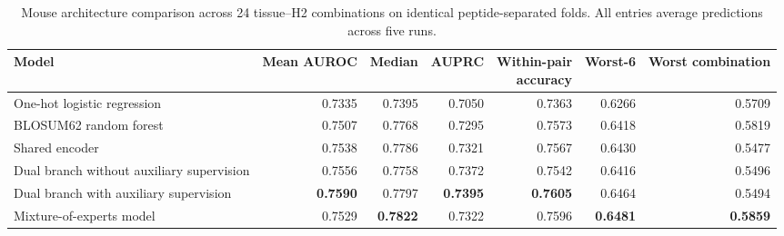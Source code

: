 \begin{table}[!b]
\centering
\caption{Mouse architecture comparison across 24 tissue--H2 combinations on identical peptide-separated folds. All entries average predictions across five runs.}
\label{tab:mouse-strict-architectures}
\fontsize{7.5}{8.5}\selectfont
\renewcommand{\arraystretch}{0.98}
\setlength{\tabcolsep}{1pt}
\begin{tabularx}{\textwidth}{>{\raggedright\arraybackslash}Xrrrrrr}
\toprule
Model & Mean AUROC & Median & AUPRC & \shortstack{Within-pair\\accuracy} & Worst-6 & Worst combination \\
\midrule
One-hot logistic regression & 0.7335 & 0.7395 & 0.7050 & 0.7363 & 0.6266 & 0.5709 \\
BLOSUM62 random forest & 0.7507 & 0.7768 & 0.7295 & 0.7573 & 0.6418 & 0.5819 \\
Shared encoder & 0.7538 & 0.7786 & 0.7321 & 0.7567 & 0.6430 & 0.5477 \\
Dual branch without auxiliary supervision & 0.7556 & 0.7758 & 0.7372 & 0.7542 & 0.6416 & 0.5496 \\
Dual branch with auxiliary supervision & \textbf{0.7590} & 0.7797 & \textbf{0.7395} & \textbf{0.7605} & 0.6464 & 0.5494 \\
Mixture-of-experts model & 0.7529 & \textbf{0.7822} & 0.7322 & 0.7596 & \textbf{0.6481} & \textbf{0.5859} \\
\bottomrule
\end{tabularx}
\end{table}

